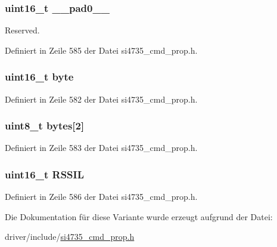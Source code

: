 \subsubsection[{\+\_\+\+\_\+pad0\+\_\+\+\_\+}]{\setlength{\rightskip}{0pt plus 5cm}uint16\+\_\+t \+\_\+\+\_\+pad0\+\_\+\+\_\+}\label{unionfm__rsq__rssi__lo__thres_a77132c2c26a75f5b8751b235cda23828}


Reserved. 



Definiert in Zeile 585 der Datei si4735\+\_\+cmd\+\_\+prop.\+h.

\hypertarget{unionfm__rsq__rssi__lo__thres_ab0549c1b5ea980a02e7eab77e21fea49}{}
\subsubsection[{byte}]{\setlength{\rightskip}{0pt plus 5cm}uint16\+\_\+t byte}\label{unionfm__rsq__rssi__lo__thres_ab0549c1b5ea980a02e7eab77e21fea49}


Definiert in Zeile 582 der Datei si4735\+\_\+cmd\+\_\+prop.\+h.

\hypertarget{unionfm__rsq__rssi__lo__thres_a46e4c05d20a047ec169f60d3167e912e}{}
\subsubsection[{bytes}]{\setlength{\rightskip}{0pt plus 5cm}uint8\+\_\+t bytes\mbox{[}2\mbox{]}}\label{unionfm__rsq__rssi__lo__thres_a46e4c05d20a047ec169f60d3167e912e}


Definiert in Zeile 583 der Datei si4735\+\_\+cmd\+\_\+prop.\+h.

\hypertarget{unionfm__rsq__rssi__lo__thres_a3486b6704157a7903fdf5db75c248898}{}
\subsubsection[{R\+S\+S\+I\+L}]{\setlength{\rightskip}{0pt plus 5cm}uint16\+\_\+t R\+S\+S\+I\+L}\label{unionfm__rsq__rssi__lo__thres_a3486b6704157a7903fdf5db75c248898}


Definiert in Zeile 586 der Datei si4735\+\_\+cmd\+\_\+prop.\+h.



Die Dokumentation für diese Variante wurde erzeugt aufgrund der Datei\+:\begin{DoxyCompactItemize}
\item 
driver/include/\hyperlink{si4735__cmd__prop_8h}{si4735\+\_\+cmd\+\_\+prop.\+h}\end{DoxyCompactItemize}
